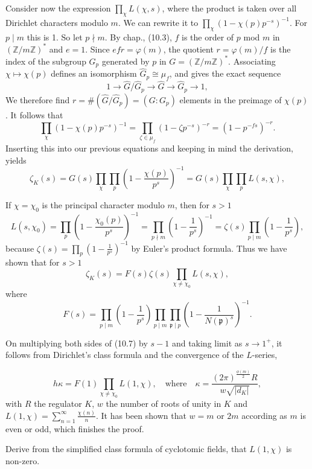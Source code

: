 Consider now the expression \( \prod_{\chi} L(\chi, s) \), where the product is taken over all Dirichlet characters modulo \( m \).
We can rewrite it to \(\prod_{\chi} (1 - \chi(p) p^{-s})^{-1}\). For \(p \mid m\) this is 1. So let \(p \nmid m\). 
By chap., (10.3), \(f\) is the order of \(p\) mod \(m\) in \((\mathbb{Z}/m\mathbb{Z})^\ast\) and \(e = 1\). 
Since \(efr = \varphi(m)\), the quotient \(r = \varphi(m)/f\) is the index of the subgroup \(G_p\) generated by \(p\) in 
\(G = (\mathbb{Z}/m\mathbb{Z})^\ast\). 
Associating \(\chi \mapsto \chi(p)\) defines an isomorphism \(\widehat{G}_p \cong \mu_f\), and gives the exact sequence
\[
    1 \longrightarrow \widehat{G}/\widehat{G}_p \longrightarrow \widehat{G} \longrightarrow \widehat{G}_p \longrightarrow 1,
\]
We therefore find \(r = \#(\widehat{G}/\widehat{G}_p) = (G : G_p)\) elements in the preimage of \(\chi(p)\). It follows that
\[
\prod_{\chi} (1 - \chi(p) p^{-s})^{-1} = \prod_{\zeta \in \mu_f} (1 - \zeta p^{-s})^{-r} = (1 - p^{-fs})^{-r}.
\]
Inserting this into our previous equations and keeping in mind the derivation, yields
\[
\zeta_K(s) = G(s) \prod_\chi \prod_p \left(1 - \frac{\chi(p)}{p^s}\right)^{-1} = G(s) \prod_\chi \prod_p L(s, \chi),
\]

If \(\chi = \chi_0\) is the principal character modulo \(m\), then for \(s > 1\)
\[
L(s, \chi_0) = \prod_p \left(1 - \frac{\chi_0(p)}{p^s}\right)^{-1} = \prod_{p \nmid m} \left(1 - \frac{1}{p^s}\right)^{-1} = \zeta(s) \prod_{p \mid m} \left(1 - \frac{1}{p^s}\right),
\]
because \(\zeta(s) = \prod_p \left(1 - \frac{1}{p^s}\right)^{-1}\) by Euler’s product formula. Thus we have shown that for \(s > 1\)
\[
\zeta_K(s) = F(s) \zeta(s) \prod_{\chi \neq \chi_0} L(s, \chi),
\]
where
\[
F(s) = \prod_{p \mid m} \left(1 - \frac{1}{p^s}\right) \prod_{p \mid m} \prod_{\mathfrak{p} \mid p} \left(1 - \frac{1}{N(\mathfrak{p})^s}\right)^{-1}.
\]

On multiplying both sides of (10.7) by \(s - 1\) and taking limit as \(s \to 1^+\), it follows from Dirichlet's class formula
and the convergence of the \( L \)-series,

\[
    h\kappa = F(1) \prod_{\chi \neq \chi_0} L(1, \chi), \quad \text{where} \quad \kappa = \frac{(2\pi)^{\frac{\phi(m)}{2}} R}{w \sqrt{|d_K|}},
\]
with \(R\) the regulator \(K\), \(w\) the number of roots of unity in \(K\) and \(L(1, \chi) = \sum_{n=1}^{\infty} \frac{\chi(n)}{n}\).
It has been shown that \( w = m \) or \( 2m \) according as \( m \) is even or odd, which finishes the proof.


Derive from the simplified class formula of cyclotomic fields, that \(L(1, \chi)\) is non-zero.


